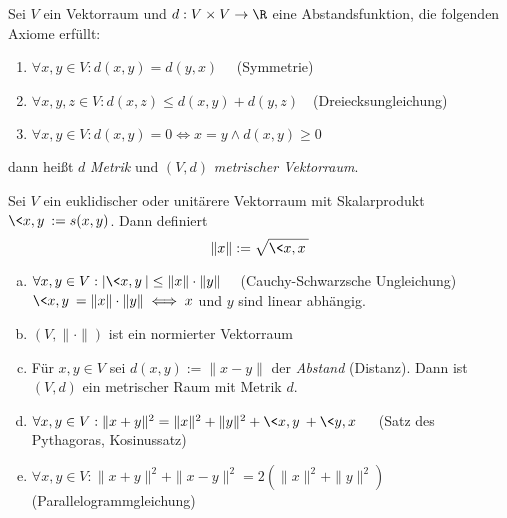 \documentclass{mycourse}
\begin{document}
\begin{df*}
	Sei $V$ ein Vektorraum und $d: V\times V \to \R$ eine Abstandsfunktion, die folgenden Axiome erfüllt:
	\begin{enumerate}[({M}1)]
		\item $\forall x,y\in V: d(x,y) = d(y,x)\quad $ (Symmetrie)
		\item $\forall x,y,z\in V: d(x,z) \le d(x,y) + d(y,z)\quad $(Dreiecksungleichung)
		\item $\forall x,y \in V: d(x,y) = 0 \iff x=y \land d(x,y) \ge 0$
	\end{enumerate}
	dann heißt $d$ \emph{Metrik} und $(V,d)$ \emph{metrischer Vektorraum}.
\end{df*}


\begin{thm}
	\label{thm:13.6}
	Sei $V$ ein euklidischer oder unitärere Vektorraum mit Skalarprodukt $\<x,y\> := s(x,y)$.
	Dann definiert
	\[
		\|x\| := \sqrt{\<x,x\>}
	\]
	\begin{enumerate}[(a)]
		\item
			$\forall x,y \in V: |\<x,y\>| \le \|x\|\cdot \|y\|\quad$ (Cauchy-Schwarzsche Ungleichung)\\
			$\<x,y\> = \|x\|\cdot \|y\| \iff x $ und $ y$ sind linear abhängig. 
		\item
			$(V,\|\cdot\|)$ ist ein normierter Vektorraum
		\item
			Für $x,y\in V$ sei $d(x,y) := \|x-y\|$ der \emph{Abstand} (Distanz).
			Dann ist $(V,d)$ ein metrischer Raum mit Metrik $d$.
		\item
			$\forall x,y \in V: \|x+y\|^2 = \|x\|^2 +\|y\|^2 + \<x,y\> + \<y,x\>\quad $ (Satz des Pythagoras, Kosinussatz)
		\item
			$\forall x,y \in V: \|x+y\|^2 + \|x-y\|^2 = 2(\|x\|^2 + \|y\|^2)\quad $ (Parallelogrammgleichung)
	\end{enumerate}


\end{thm}
\end{document}
